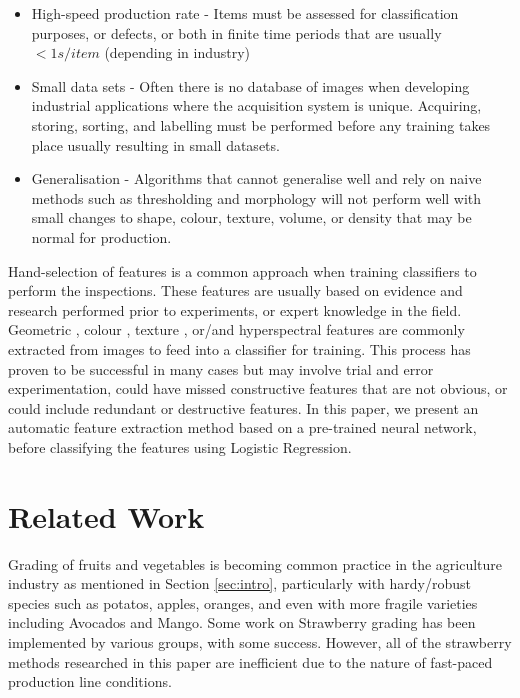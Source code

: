 \documentclass[conference]{IEEEtran}
\begin{document}
\begin{itemize}
	\item High-speed production rate - Items must be assessed for classification purposes, or defects, or both in finite time periods that are usually $<1s/item$ (depending in industry)
	\item Small data sets - Often there is no database of images when developing industrial applications where the acquisition system is unique. Acquiring, storing, sorting, and labelling must be performed before any training takes place usually resulting in small datasets.
	\item Generalisation - Algorithms that cannot generalise well and rely on naive methods such as thresholding and morphology will not perform well with small changes to shape, colour, texture, volume, or density that may be normal for production. 
\end{itemize}

Hand-selection of features is a common approach when training classifiers to perform the inspections. These features are usually based on evidence and research performed prior to experiments, or expert knowledge in the field. Geometric \cite{bato, costa}, colour \cite{eaton2, yamamoto, cubero}, texture \cite{moallum, saldana, zhang}, or/and hyperspectral \cite{keresztes, liu} features are commonly extracted from images to feed into a classifier for training. This process has proven to be successful in many cases but may involve trial and error experimentation, could have missed constructive features that are not obvious, or could include redundant or destructive features. In this paper, we present an automatic feature extraction method based on a pre-trained neural network, before classifying the features using Logistic Regression.  








\section{Related Work}

Grading of fruits and vegetables is becoming common practice in the agriculture industry as mentioned in Section \ref{sec:intro}, particularly with hardy/robust species such as potatos, apples, oranges, and even with more fragile varieties including Avocados and Mango. Some work on Strawberry grading has been implemented by various groups, with some success. However, all of the strawberry methods researched in this paper are inefficient due to the nature of fast-paced production line conditions.
\end{document}
